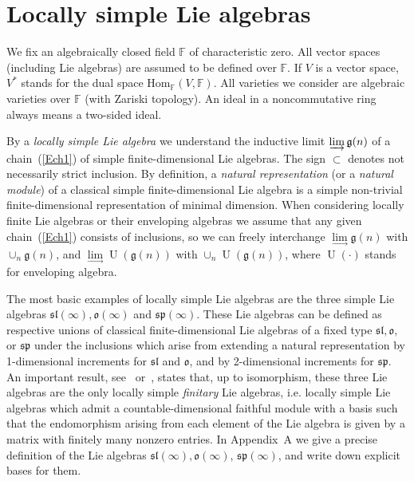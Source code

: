 \documentclass{emsprocart}
\begin{document}
\section{Locally simple Lie algebras}

We fix an algebraically closed field $\mathbb F$ of characteristic zero. All
vector spaces (including Lie algebras) are assumed to be defined
over $\mathbb F$. If $V$ is a vector space, $V^*$ stands for the
dual space Hom$_\mathbb F(V, \mathbb F)$. All varieties we consider are algebraic varieties over $\mathbb F$ (with Zariski topology).
An ideal in a noncommutative ring always means a two-sided ideal.

By a {\it locally simple Lie algebra} we understand the inductive limit $\varinjlim \mathfrak g(n)$ of a chain~(\ref{Ech1}) of simple finite-dimensional Lie algebras.
The sign $\subset$ denotes not necessarily strict inclusion. By definition, a {\it natural
representation} (or a {\it natural module}) of a classical simple finite-dimensional Lie
algebra is a simple non-trivial finite-dimensional representation of minimal
dimension. When considering locally finite Lie algebras or their enveloping algebras we assume
that any given chain~(\ref{Ech1}) consists of inclusions, so we can freely
interchange $\lim\limits_{\to}\mathfrak g(n)$ with $\cup_n\mathfrak g(n)$, and $\lim\limits_{\to}\operatorname{U}(\mathfrak g(n))$ with $\cup_n\operatorname{U}(\mathfrak g(n))$, where $\operatorname{U}(\cdot)$ stands for enveloping algebra.


The most basic examples of locally simple Lie algebras are the three simple Lie
algebras $\mathfrak{sl}(\infty), \mathfrak o(\infty)$ and $\mathfrak{sp}(\infty)$.
These Lie algebras can be defined as respective unions of classical finite-dimensional Lie algebras of a fixed type
$\mathfrak{sl}, \mathfrak o,$ or $\mathfrak{sp}$ under the inclusions which arise from extending a natural representation by 1-dimensional increments for $\mathfrak{sl}$ and $\mathfrak o$, and by 2-dimensional increments for $\mathfrak{sp}$. An important result, see~\cite{Ba1}
or~\cite{BS}, states that, up to isomorphism, these three Lie
algebras are the only locally simple {\it finitary} Lie algebras, i.e.
locally simple Lie algebras which admit a countable-dimensional
faithful module with a basis such that the endomorphism arising from
each element of the Lie algebra is given by a matrix with finitely
many nonzero entries. In Appendix~A we give a precise definition of the Lie algebras $\mathfrak{sl}(\infty), \mathfrak o(\infty)$, $\mathfrak{sp}(\infty)$, and write down explicit bases for them.
\end{document}
